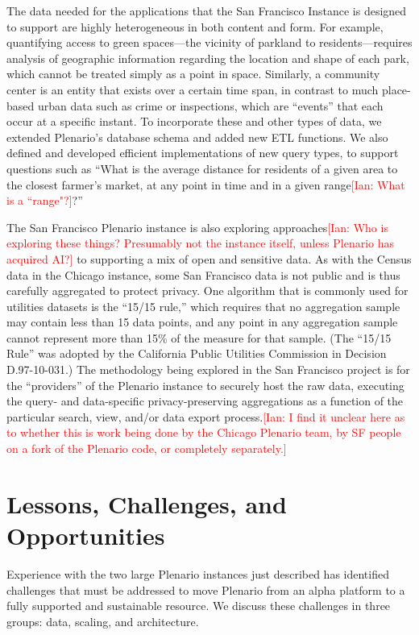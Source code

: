 \documentclass[11pt]{article}
\newcommand{\ian}[1]{\textcolor{Red}{[Ian: #1]}}
\newcommand{\ian}[1]{}
\begin{document}
The data needed for the applications that the San Francisco Instance is designed to support are highly heterogeneous in both content and form. For example, quantifying access to green spaces---the vicinity of parkland to residents---requires analysis of geographic information regarding the location and shape of each park, which cannot be treated simply as a point in space. Similarly, a community center is an entity that exists over a certain time span, in contrast to much place-based urban data such as crime or inspections, which are ``events'' that each occur at a specific instant.  
To incorporate these and other types of data, we extended Plenario's database schema and added new ETL functions. We also defined and developed efficient implementations of new query types, to support questions such as ``What is the average distance for residents of a given area to the closest farmer's market, at any point in time and in a given range\ian{What is a ``range"?}?''

The San Francisco Plenario instance is also exploring approaches\ian{Who is exploring these things? Presumably not the instance itself, unless Plenario has acquired AI?} to supporting a mix of open and sensitive data. As with the Census data in the Chicago instance, some San Francisco data is not public and is thus carefully aggregated to protect privacy. One algorithm that is commonly used for utilities datasets is the ``15/15 rule,'' which requires that no aggregation sample may contain less than 15 data points, and any point in any aggregation sample cannot represent more than 15\% of the measure for that sample. (The ``15/15 Rule'' was adopted by the California Public Utilities Commission in Decision D.97-10-031.) The methodology being explored in the San Francisco project is for the ``providers'' of the Plenario instance to securely host the raw data, executing the query- and data-specific privacy-preserving aggregations as a function of the particular search, view, and/or data export process.\ian{I find it unclear here as to whether this is work being done by the Chicago Plenario team, by SF people on a fork of the Plenario code, or completely separately.}

\section{Lessons, Challenges, and Opportunities}\label{sec:challenges}
Experience with the two large Plenario instances just described has identified challenges that must be addressed to move Plenario from an alpha platform to a fully supported and sustainable resource. We discuss these challenges in three groups: data, scaling, and architecture. 
\end{document}

